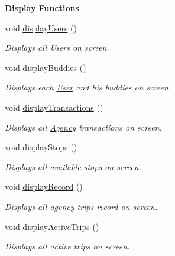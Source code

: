 \begin{Indent}\textbf{ Display Functions}\par
\begin{DoxyCompactItemize}
\item 
void \hyperlink{class_agency_a485882deafb4fc8d075c9cb096ebd35c}{display\+Users} ()
\begin{DoxyCompactList}\small\item\em Displays all Users on screen. \end{DoxyCompactList}\item 
\mbox{\label{class_agency_a319cf67aaea58bc778455283a18fd2c0}} 
void \hyperlink{class_agency_a319cf67aaea58bc778455283a18fd2c0}{display\+Buddies} ()
\begin{DoxyCompactList}\small\item\em Displays each \hyperlink{class_user}{User} and his buddies on screen. \end{DoxyCompactList}\item 
\mbox{\label{class_agency_ad3c880c51f35459cf189ffc4a43203ba}} 
void \hyperlink{class_agency_ad3c880c51f35459cf189ffc4a43203ba}{display\+Transactions} ()
\begin{DoxyCompactList}\small\item\em Displays all \hyperlink{class_agency}{Agency} transactions on screen. \end{DoxyCompactList}\item 
\mbox{\label{class_agency_aae86bb356ef4c2f1232d33408e5a3a22}} 
void \hyperlink{class_agency_aae86bb356ef4c2f1232d33408e5a3a22}{display\+Stops} ()
\begin{DoxyCompactList}\small\item\em Displays all available stops on screen. \end{DoxyCompactList}\item 
\mbox{\label{class_agency_abae4f41bfdd7c7965701afe34ad5aec4}} 
void \hyperlink{class_agency_abae4f41bfdd7c7965701afe34ad5aec4}{display\+Record} ()
\begin{DoxyCompactList}\small\item\em Displays all agency trips record on screen. \end{DoxyCompactList}\item 
\mbox{\label{class_agency_a3ce9f0643c267083baa3145ddbfd72a4}} 
void \hyperlink{class_agency_a3ce9f0643c267083baa3145ddbfd72a4}{display\+Active\+Trips} ()
\begin{DoxyCompactList}\small\item\em Displays all active trips on screen. \end{DoxyCompactList}\end{DoxyCompactItemize}
\end{Indent}
